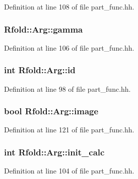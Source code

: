 Definition at line 108 of file part\+\_\+func.\+hh.

\hypertarget{class_rfold_1_1_arg_a54717ae319eecf4154dba39e42094b60}{
\subsubsection[{gamma}]{ Rfold\+::\+Arg\+::gamma}}\label{class_rfold_1_1_arg_a54717ae319eecf4154dba39e42094b60}


Definition at line 106 of file part\+\_\+func.\+hh.

\hypertarget{class_rfold_1_1_arg_a49ec979ca116afb70aa7a25bff04d3a8}{
\subsubsection[{id}]{\setlength{\rightskip}{0pt plus 5cm}int Rfold\+::\+Arg\+::id}}\label{class_rfold_1_1_arg_a49ec979ca116afb70aa7a25bff04d3a8}


Definition at line 98 of file part\+\_\+func.\+hh.

\hypertarget{class_rfold_1_1_arg_ab7df3ff6900da414d534707f37d87c2d}{
\subsubsection[{image}]{\setlength{\rightskip}{0pt plus 5cm}bool Rfold\+::\+Arg\+::image}}\label{class_rfold_1_1_arg_ab7df3ff6900da414d534707f37d87c2d}


Definition at line 121 of file part\+\_\+func.\+hh.

\hypertarget{class_rfold_1_1_arg_af97e7ba185a8a01a2d6baa5a1689f077}{
\subsubsection[{init\+\_\+calc}]{\setlength{\rightskip}{0pt plus 5cm}int Rfold\+::\+Arg\+::init\+\_\+calc}}\label{class_rfold_1_1_arg_af97e7ba185a8a01a2d6baa5a1689f077}


Definition at line 104 of file part\+\_\+func.\+hh.

